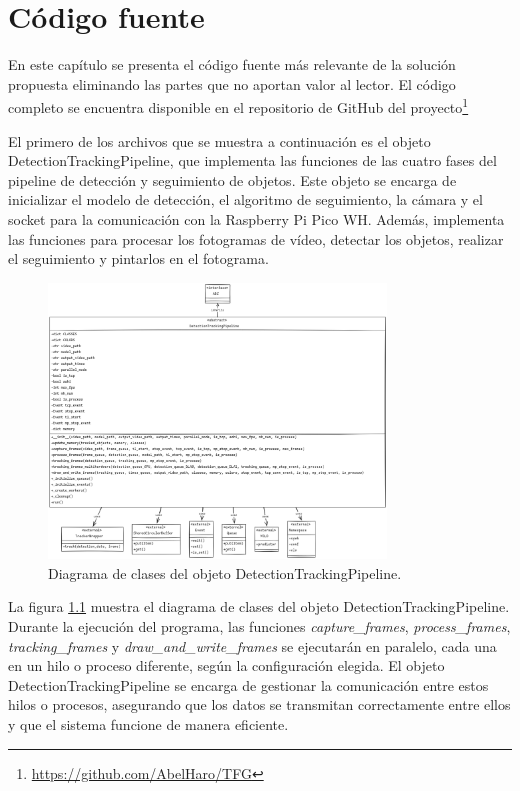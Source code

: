 \documentclass[11pt,spanish,listoffigures,listoftables]{tfgetsinf}
\begin{document}
\chapter{Código fuente} \label{ch:codigo_fuente}

En este capítulo se presenta el código fuente más relevante de la solución propuesta eliminando las partes que no aportan valor al lector. El código completo se encuentra disponible en el repositorio de GitHub del proyecto\footnote{\url{https://github.com/AbelHaro/TFG}}

El primero de los archivos que se muestra a continuación es el objeto DetectionTrackingPipeline, que implementa las funciones de las cuatro fases del pipeline de detección y seguimiento de objetos. Este objeto se encarga de inicializar el modelo de detección, el algoritmo de seguimiento, la cámara y el socket para la comunicación con la Raspberry Pi Pico WH. Además, implementa las funciones para procesar los fotogramas de vídeo, detectar los objetos, realizar el seguimiento y pintarlos en el fotograma.

\begin{figure}[H]
   \centering
   \includegraphics[width=0.8\textwidth]{codigo/images/detection_tracking_pipeline_uml.png}
      \caption[Diagrama de clases del objeto DetectionTrackingPipeline]{Diagrama de clases del objeto DetectionTrackingPipeline.}
      \label{fig:detection_tracking_pipeline_uml}
   \end{figure}

   La figura \ref{fig:detection_tracking_pipeline_uml} muestra el diagrama de clases del objeto DetectionTrackingPipeline. Durante la ejecución del programa, las funciones \textit{capture\_frames}, \textit{process\_frames}, \textit{tracking\_frames} y \textit{draw\_and\_write\_frames} se ejecutarán en paralelo, cada una en un hilo o proceso diferente, según la configuración elegida. El objeto DetectionTrackingPipeline se encarga de gestionar la comunicación entre estos hilos o procesos, asegurando que los datos se transmitan correctamente entre ellos y que el sistema funcione de manera eficiente.
\end{document}
